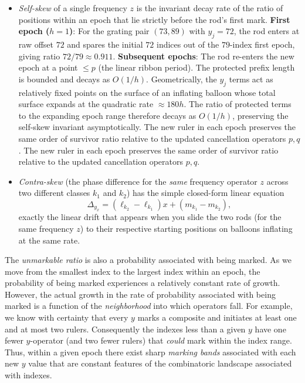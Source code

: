 \documentclass[11pt,a4paper]{article}
\begin{document}
\begin{itemize}
\item \emph{Self-skew} of a single frequency \(z\) is the invariant decay rate of the ratio of positions within an epoch that lie strictly before the rod’s first mark.  
  \textbf{First epoch (\(h=1\))}: For the grating pair \((73,89)\) with \(y_j=72\), the rod enters at raw offset \(72\) and spares the initial \(72\) indices out of the \(79\)-index first epoch, giving ratio \(72/79 \approx 0.911\).  
  \textbf{Subsequent epochs}: The rod re-enters the new epoch at a point \(\le p\) (the linear ribbon period). The protected prefix length is bounded and decays as \(O(1/h)\). Geometrically, the \(y_j\) terms act as relatively fixed points on the surface of an inflating balloon whose total surface expands at the quadratic rate \(\approx 180h\). The ratio of protected terms to the expanding epoch range therefore decays as \(O(1/h)\), preserving the self-skew invariant asymptotically. The new ruler in each epoch preserves the same order of survivor ratio relative to the updated cancellation operators \(p,q\).
  The new ruler in each epoch preserves the same order of survivor ratio relative to the updated cancellation operators \(p,q\).
   
\item \emph{Contra-skew} (the phase difference for the \emph{same} frequency operator \(z\) across two different classes \(k_1\) and \(k_2\)) has the simple closed-form linear equation
\[
\Delta_{y_x}=(\ell_{k_2}-\ell_{k_1})x+(m_{k_1}-m_{k_2}),
\]
exactly the linear drift that appears when you slide the two rods (for the same frequency \(z\)) to their respective starting positions on balloons inflating at the same rate.
\end{itemize}

The \emph{unmarkable ratio} is also a probability associated with being marked. As we move from the smallest index to the largest index within an epoch, the probability of being marked experiences a relatively constant rate of growth. However, the actual growth in the rate of probability associated with being marked is a function of the \emph{neighborhood} into which operators fall. For example, we know with certainty that every \(y\) marks a composite and initiates at least one and at most two rulers. Consequently the indexes less than a given \(y\) have one fewer \(y\)-operator (and two fewer rulers) that \emph{could} mark within the index range. Thus, within a given epoch there exist sharp \emph{marking bands} associated with each new \(y\) value that are constant features of the combinatoric landscape associated with indexes.
\end{document}

